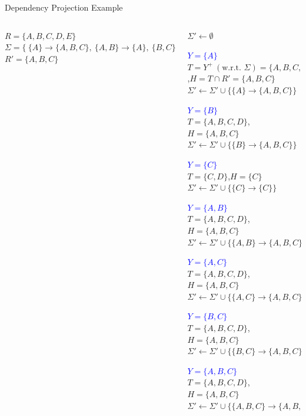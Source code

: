 \documentclass[UTF8]{beamer}
\begin{document}
\begin{frame}[fragile]{Dependency Projection Example}
\scriptsize
\begin{columns}
  \begin{column}{0.3\textwidth}
    $R=\{A,B,C,D,E\}$\\[0.2cm]
    $\Sigma=\{\ \{A\}\!\to\!\{A,B,C\},\ \{A,B\}\!\to\!\{A\},\ \{B,C\}\!\to\!\{A,D\},\ \{B\}\!\to\!\{A,B\},\ \{C\}\!\to\!\{D\}\ \}$\\[0.2cm]
    $R'=\{A,B,C\}$
  \end{column}
  \begin{column}{0.7\textwidth}
    \tiny
    $\Sigma' \gets \emptyset$\\[2pt]\pause

    \textcolor{blue}{$Y=\{A\}$} \\
    $T=Y^+ \ (\text{w.r.t. }\Sigma)=\{A,B,C,D\}$,\quad $H=T\cap R'=\{A,B,C\}$\\
    $\Sigma' \gets \Sigma' \cup \{\{A\}\to\{A,B,C\}\}$\\[4pt]\pause

    \textcolor{blue}{$Y=\{B\}$} \\
    $T=\{A,B,C,D\}$,\quad $H=\{A,B,C\}$\\
    $\Sigma' \gets \Sigma' \cup \{\{B\}\to\{A,B,C\}\}$\\[4pt]\pause

    \textcolor{blue}{$Y=\{C\}$} \\
    $T=\{C,D\}$,\quad $H=\{C\}$\\
    $\Sigma' \gets \Sigma' \cup \{\{C\}\to\{C\}\}$\\[4pt]\pause

    \textcolor{blue}{$Y=\{A,B\}$} \\
    $T=\{A,B,C,D\}$,\quad $H=\{A,B,C\}$\\
    $\Sigma' \gets \Sigma' \cup \{\{A,B\}\to\{A,B,C\}\}$\\[4pt]\pause

    \textcolor{blue}{$Y=\{A,C\}$} \\
    $T=\{A,B,C,D\}$,\quad $H=\{A,B,C\}$\\
    $\Sigma' \gets \Sigma' \cup \{\{A,C\}\to\{A,B,C\}\}$\\[4pt]\pause

    \textcolor{blue}{$Y=\{B,C\}$} \\
    $T=\{A,B,C,D\}$,\quad $H=\{A,B,C\}$\\
    $\Sigma' \gets \Sigma' \cup \{\{B,C\}\to\{A,B,C\}\}$\\[4pt]\pause

    \textcolor{blue}{$Y=\{A,B,C\}$} \\
    $T=\{A,B,C,D\}$,\quad $H=\{A,B,C\}$\\
    $\Sigma' \gets \Sigma' \cup \{\{A,B,C\}\to\{A,B,C\}\}$
  \end{column}
\end{columns}
\end{frame}
\end{document}
